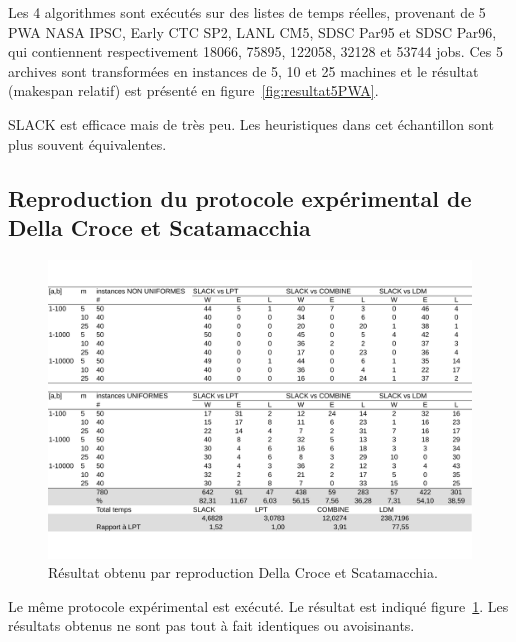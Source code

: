 \documentclass[a4paper,12pt]{report}
\theoremstyle{plain}				%
\theoremstyle{definition}				%
\begin{document}
 Les 4 algorithmes sont exécutés sur des listes de temps réelles, provenant de 5 PWA NASA IPSC, Early CTC SP2, LANL CM5, SDSC Par95 et SDSC Par96, qui contiennent respectivement 18066, 75895, 122058, 32128 et 53744 jobs. Ces 5 archives sont transformées en instances de 5, 10 et 25 machines et le résultat (makespan relatif) est présenté en figure~\ref{fig:resultat5PWA}.
 
SLACK est efficace mais de très peu. 
Les heuristiques dans cet échantillon sont plus souvent équivalentes.  
 
\subsection{Reproduction du protocole expérimental de Della Croce et Scatamacchia}
\label{ssec:resultatsReroductionPrtocoleExperimentalDellaCroceScatamacchia}
 
\begin{figure}
{\centering
\includegraphics[width=\columnwidth]{3_Resultat_Reproduction_De_DCS.pdf}
\caption{Résultat obtenu par reproduction Della Croce et Scatamacchia.}
\label{fig:resultatReproductionDellaCroceScatamacchia}
\par}
\end{figure}

Le même protocole expérimental est exécuté. Le résultat est indiqué 
  figure~\ref{fig:resultatReproductionDellaCroceScatamacchia}.
Les résultats obtenus ne sont pas tout à fait identiques ou avoisinants. 
  
\end{document}
